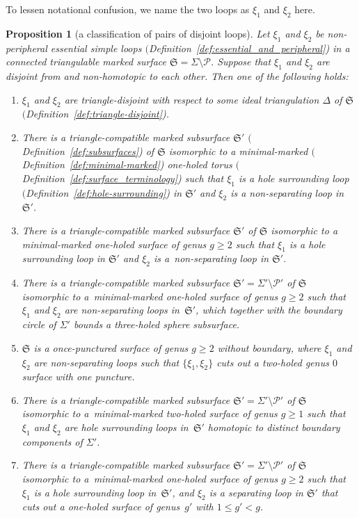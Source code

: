\documentclass[10pt,a4paper]{amsart}
\numberwithin{equation}{section}
\newtheorem{Proposition}[Theorem]{Proposition}
\theoremstyle{definition}
\begin{document}
To lessen notational confusion, we name the two loops as $\xi_1$ and $\xi_2$ here.
\begin{Proposition}[a classification of pairs of disjoint loops]
\label{prop:classification_of_pair_of_loops}
Let $\xi_1$ and $\xi_2$ be non-peripheral essential simple loops $($Definition~{\rm \ref{def:essential_and_peripheral})} in a connected triangulable marked surface $\mathfrak{S} = \Sigma\setminus\mathcal{P}$. Suppose that $\xi_1$ and $\xi_2$ are disjoint from and non-homotopic to each other. Then one of the following holds:
\begin{enumerate}[label={\rm (PL\arabic*)}]\itemsep=0pt\setlength{\leftskip}{0.22cm}
\item\label{PL1} $\xi_1$ and $\xi_2$ are triangle-disjoint with respect to some ideal triangulation $\Delta$ of $\mathfrak{S}$ $($Defini\-tion~{\rm \ref{def:triangle-disjoint})}.
\item\label{PL2} There is a triangle-compatible marked subsurface $\mathfrak{S}'$ $($Definition~{\rm \ref{def:subsurfaces})} of $\mathfrak{S}$ isomorphic to a minimal-marked $($Definition~{\rm \ref{def:minimal-marked})} one-holed torus $($Definition~{\rm \ref{def:surface_terminology})} such that $\xi_1$ is a hole surrounding loop $($Definition~{\rm \ref{def:hole-surrounding})} in $\mathfrak{S}'$ and $\xi_2$ is a non-separating loop in $\mathfrak{S}'$.
\item\label{PL3} There is a triangle-compatible marked subsurface $\mathfrak{S}'$ of $\mathfrak{S}$ isomorphic to a minimal-marked one-holed surface of genus $g\ge 2$ such that $\xi_1$ is a hole surrounding loop in $\mathfrak{S}'$ and $\xi_2$ is a~non-separating loop in $\mathfrak{S}'$.
\item\label{PL4} There is a triangle-compatible marked subsurface $\mathfrak{S}' = \Sigma'\setminus \mathcal{P}'$ of $\mathfrak{S}$ isomorphic to a~mini\-mal-marked one-holed surface of genus $g\ge 2$ such that $\xi_1$ and $\xi_2$ are non-separating loops in~$\mathfrak{S}'$, which together with the boundary circle of $\Sigma'$ bounds a three-holed sphere subsurface.
\item\label{PL5} $\mathfrak{S}$ is a once-punctured surface of genus $g\ge 2$ without boundary, where $\xi_1$ and $\xi_2$ are non-separating loops such that $\{\xi_1,\xi_2\}$ cuts out a two-holed genus $0$ surface with one puncture.
\item\label{PL6} There is a triangle-compatible marked subsurface $\mathfrak{S}' = \Sigma'\setminus \mathcal{P}'$ of $\mathfrak{S}$ isomorphic to a~mini\-mal-marked two-holed surface of genus $g\ge 1$ such that $\xi_1$ and $\xi_2$ are hole surrounding loops in~$\mathfrak{S}'$ homotopic to distinct boundary components of $\Sigma'$.
\item\label{PL7} There is a triangle-compatible marked subsurface $\mathfrak{S}' = \Sigma'\setminus \mathcal{P}'$ of $\mathfrak{S}$ isomorphic to a~mini\-mal-marked one-holed surface of genus $g\ge 2$ such that $\xi_1$ is a hole surrounding loop in~$\mathfrak{S}'$, and $\xi_2$ is a separating loop in $\mathfrak{S}'$ that cuts out a one-holed surface of genus~$g'$ with $1\le g'<g$.
\end{enumerate}
\end{Proposition}
\end{document}
